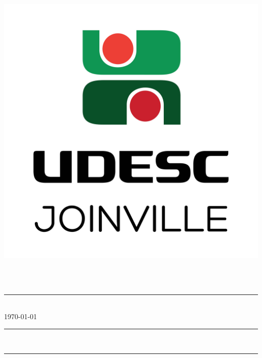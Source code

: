 \thispagestyle{empty}
\center
\begin{minipage}[!]{\linewidth}
	\begin{minipage}[!]{.19\linewidth}
		\includegraphics[width=\textwidth]{img/Marca Joinville Vertical RGB-01.jpg}				
	\end{minipage}
	\begin{minipage}[!]{.8\linewidth}
		\center
		\textsf{
			\large{
				\instituicao \\ \vspace{0.1cm}
				\centro \\ \vspace{0.17cm}
				\departamento
			}	
		}		
	\end{minipage}
	\center
	\rule{\textwidth}{1pt}	
	\textsc{\autor} \\
	\today \\ 
	\rule{\textwidth}{1pt}	
\end{minipage}
\begin{center}
   \textbf{\titulo}\\   
   \rule{.3\textwidth}{0.1pt}\\     
\end{center}
\vspace{12pt}
\subtitulo\\
\vspace{36pt} 
\renewcommand{\thesection}{\Roman{section}}

\tableofcontents*
\cleardoublepage

\pagestyle{fancy}
\fancyhf{}
\lhead{\rightmark}